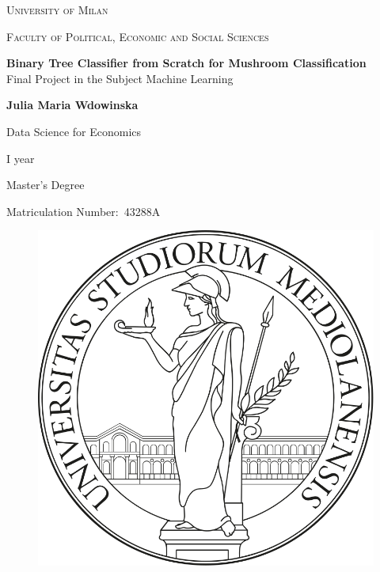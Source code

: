 \documentclass{article}
\author{Julia Maria Wdowinska}
\date{} %
\begin{document}
\begin{titlepage}
    \centering
    \vfill
    {\scshape\Large University of Milan \par}
    \vspace{0.5cm}
    {\scshape\large Faculty of Political, Economic and Social Sciences \par}
    \vspace{3cm}
    {\huge
    \textbf{Binary Tree Classifier from Scratch for Mushroom Classification} \\
    \vspace{0.5cm}
    \large Final Project in the Subject Machine Learning \par}
    \vspace{2cm}
    {\large \textbf{Julia Maria Wdowinska} \par}
    \vspace{0.5cm}
    {\large Data Science for Economics \par}
    {\large I year\par}
    {\large Master’s Degree \par}
    {\large Matriculation Number:\ 43288A \par}
\vfill
\begin{center}
\begin{figure}[h!]\centering
 \includegraphics[keepaspectratio=true,scale=0.2]{logo} \\

\end{figure}
\end{center}
\end{titlepage}
\end{document}
